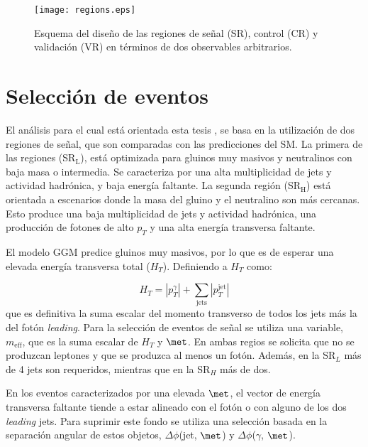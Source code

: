 \begin{figure}
\centering
\texttt{[image: regions.eps]}
\caption{Esquema del diseño de las regiones de señal (SR), control (CR) y validación (VR) en términos de dos observables arbitrarios.}
\label{regions}
\end{figure}

\section{Selección de eventos}

El análisis para el cual está orientada esta tesis \cite{Collaboration:2198651}, se basa en la utilización de dos regiones de señal, que son comparadas con las predicciones del SM. La primera de las regiones (SR$_{\text{L}}$), está optimizada para gluinos muy masivos y neutralinos con baja masa o intermedia. Se caracteriza por una alta multiplicidad de jets y actividad hadrónica, y baja energía faltante. La segunda región (SR$_{\text{H}}$) está orientada a escenarios donde la masa del gluino y el neutralino son más cercanas. Esto produce una baja multiplicidad de jets y actividad hadrónica, una producción de fotones de alto $p_{T}$ y una alta energía transversa faltante.

El modelo GGM predice gluinos muy masivos, por lo que es de esperar una elevada energía transversa total ($H_{T}$). Definiendo a $H_{T}$ como:

\begin{equation}
H_{T}=|p_{T}^{\gamma}|+\sum_{\text{jets}}|p_{T}^{\text{jet}}|
\end{equation} 
que es definitiva la suma escalar del momento transverso de todos los jets más la del fotón \textit{leading}. Para la selección de eventos de señal se utiliza una variable, $m_{\text{eff}}$, que es la suma escalar de $H_{T}$ y $\met$. En ambas regios se solicita que no se produzcan leptones y que se produzca al menos un fotón. Además, en la SR$_{L}$ más de 4 jets son requeridos, mientras que en la SR$_{H}$ más de dos.

En los eventos caracterizados por una elevada $\met$, el vector de energía transversa faltante tiende a estar alineado con el fotón o con alguno de los dos \textit{leading} jets. Para suprimir este fondo se utiliza una selección basada en la separación angular de estos objetos, $\Delta\phi$(jet, $\met$) y $\Delta\phi$($\gamma$, $\met$).

